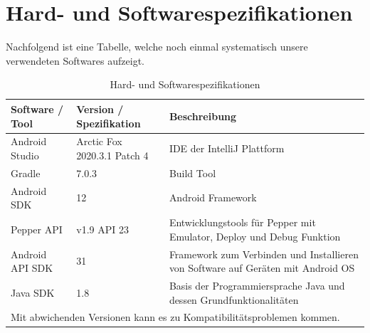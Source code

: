 \section{Hard- und Softwarespezifikationen}
Nachfolgend ist eine Tabelle, welche noch einmal systematisch unsere verwendeten Softwares aufzeigt.
\begin{table}[H]
    \caption{Hard- und Softwarespezifikationen}
    \label{table}
    \setlength{\tabcolsep}{3pt}
    \begin{tabular}{|p{100pt}|p{120pt}|p{180pt}|}
        \hline
        Software / Tool & Version / Spezifikation     & Beschreibung                                                                     \\
        \hline\hline
        Android Studio  & Arctic Fox 2020.3.1 Patch 4 & IDE der IntelliJ Plattform                                                       \\
        \hline
        Gradle          & 7.0.3                       & Build Tool                                                                       \\
        \hline
        Android SDK     & 12                          & Android Framework                                                                \\
        \hline
        Pepper API      & v1.9  API 23                & Entwicklungstools für Pepper mit Emulator, Deploy und Debug Funktion             \\
        \hline
        Android API SDK & 31                          & Framework zum Verbinden und Installieren von Software auf Geräten mit Android OS \\
        \hline
        Java SDK        & 1.8                         & Basis der Programmiersprache Java und dessen Grundfunktionalitäten               \\
        \hline
        \multicolumn{3}{p{380pt}}{Mit abwichenden Versionen kann es zu Kompatibilitätsproblemen kommen.}
    \end{tabular}
    \label{tab1}
\end{table}

